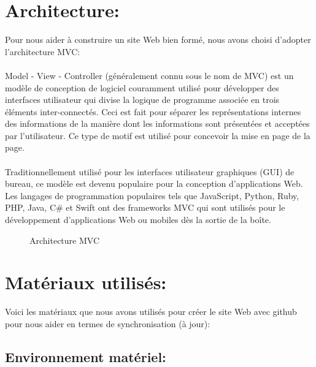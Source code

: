 \documentclass[12pt]{report}
\begin{document}
\newpage

\section{Architecture:}

Pour nous aider à construire un site Web bien formé, nous avons choisi d'adopter l'architecture MVC:
\\\\
Model - View - Controller (généralement connu sous le nom de MVC) est un modèle de conception de logiciel couramment utilisé pour développer des interfaces utilisateur qui divise la logique de programme associée en trois éléments inter-connectés. Ceci est fait pour séparer les représentations internes des informations de la manière dont les informations sont présentées et acceptées par l'utilisateur. Ce type de motif est utilisé pour concevoir la mise en page de la page.
\\\\
Traditionnellement utilisé pour les interfaces utilisateur graphiques (GUI) de bureau, ce modèle est devenu populaire pour la conception d'applications Web. Les langages de programmation populaires tels que JavaScript, Python, Ruby, PHP, Java, C\# et Swift ont des frameworks MVC qui sont utilisés pour le développement d'applications Web ou mobiles dès la sortie de la boîte.

\vspace{0.5in}

\begin{figure}[h]
\centering
\caption{Architecture MVC}
\end{figure}

\newpage

\section{Matériaux utilisés:}

Voici les matériaux que nous avons utilisés pour créer le site Web avec github pour nous aider en termes de synchronisation (à jour):

\subsection{Environnement matériel:}

\vspace{0.1in}
\end{document}
